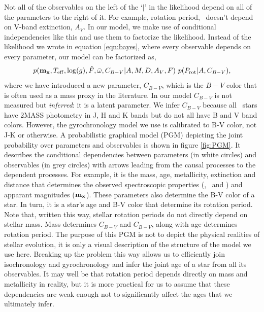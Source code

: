 Not all of the observables on the left of the `$|$' in the likelihood depend
on all of the parameters to the right of it.
For example, rotation period, \prot\ doesn't depend on V-band extinction,
$A_V$.
In our model, we make use of conditional independencies like this and use them
to factorize the likelihood.
Instead of the likelihood we wrote in equation \ref{eqn:bayes},
where every observable depends on every parameter, our model can be factorized
as,
\begin{equation}
    p({\bf m_x}, T_{\mathrm{eff}}, \log(g), \hat{F}, \bar{\omega},
    C_{B-V}|A, M, D, A_V, F) ~p(P_\mathrm{rot}|A, C_{B-V}),
\label{eqn:factorized}
\end{equation}
where we have introduced a new parameter, $C_{B-V}$, which is the $B-V$ color
that is often used as a mass proxy in the literature.
In our model $C_{B-V}$ is not measured but {\it inferred}: it is a latent
parameter.
We infer $C_{B-V}$ because all \kepler\ stars have 2MASS photometry in J, H
and K bands but do not all have B and V band colors.
However, the gyrochronology model we use is calibrated to B-V color, not J-K
or otherwise.
A probabilistic graphical model (PGM) depicting the joint probability over
parameters and observables is shown in figure \ref{fig:PGM}.
It describes the conditional dependencies between parameters (in white
circles) and observables (in grey circles) with arrows leading from the causal
processes to the dependent processes.
For example, it is the mass, age, metallicity, extinction and distance that
determines the observed spectroscopic properties (\teff, \logg\ and \feh)
and apparant magnitudes (${\bf m_x}$).
These parameters also determine the B-V color of a star.
In turn, it is a star's age and B-V color that determine its rotation period.
Note that, written this way, stellar rotation periods do not directly depend
on stellar mass.
Mass determines $C_{B-V}$ and $C_{B-V}$, along with age determines rotation
period.
The purpose of this PGM is not to depict the physical realities of stellar
evolution, it is only a visual description of the structure of the model we
use here.
Breaking up the problem this way allows us to efficiently join isochronology
and gyrochronology and infer the joint age of a star from all its observables.
It may well be that rotation period depends directly on mass and metallicity
in reality, but it is more practical for us to assume that these dependencies
are weak enough not to significantly affect the ages that we ultimately infer.

